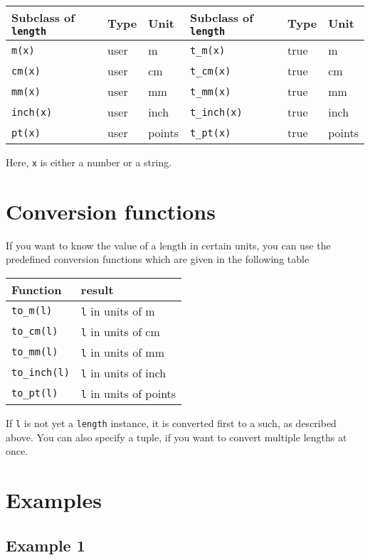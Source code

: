 \medskip
\begin{center}
\begin{tabular}{lll|lll}
Subclass of \texttt{length} & Type & Unit & Subclass of \texttt{length} & Type & Unit\\
\hline
\texttt{m(x)} & user & m & \texttt{t\_m(x)} & true & m\\
\texttt{cm(x)} & user & cm & \texttt{t\_cm(x)} & true & cm\\
\texttt{mm(x)} & user & mm & \texttt{t\_mm(x)} & true & mm\\
\texttt{inch(x)} & user & inch & \texttt{t\_inch(x)} & true & inch\\
\texttt{pt(x)} & user & points & \texttt{t\_pt(x)} & true & points\\
\end{tabular}
\end{center}
\medskip
Here, \verb|x| is either a number or a string.

\section{Conversion functions}
If you want to know the value of a \PyX{} length in certain units, you
can use the predefined conversion functions which are given in the
following table
\begin{center}
\begin{tabular}{ll}
Function & result \\
\hline
\texttt{to\_m(l)} & \texttt{l} in units of m\\
\texttt{to\_cm(l)} & \texttt{l} in units of cm\\
\texttt{to\_mm(l)} & \texttt{l} in units of mm\\
\texttt{to\_inch(l)} & \texttt{l} in units of inch\\
\texttt{to\_pt(l)} & \texttt{l} in units of points\\
\end{tabular}
\end{center}
If \verb|l| is not yet a \verb|length| instance, it is converted first
to a such, as described above. You can also specify a tuple, if you
want to convert multiple lengths at once.


\section{Examples}


\subsection{Example 1}



